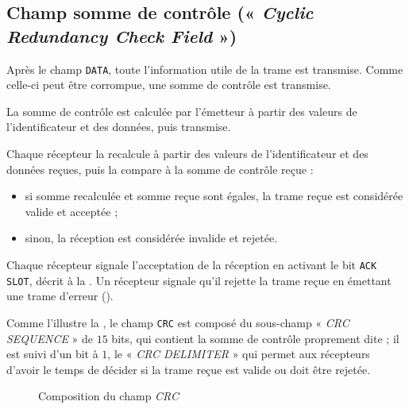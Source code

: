 \subsection{Champ somme de contrôle (« \emph{Cyclic Redundancy Check Field} »)}

Après le champ \texttt{DATA}, toute l'information utile de la trame est transmise. Comme celle-ci peut être corrompue, une somme de contrôle est transmise. 

La somme de contrôle est calculée par l'émetteur à partir des valeurs de l'identificateur et des données, puis transmise.

Chaque récepteur la recalcule à partir des valeurs de l'identificateur et des données reçues, puis la compare à la somme de contrôle reçue :
\begin{itemize}
  \item si somme recalculée et somme reçue sont égales, la trame reçue est considérée valide et acceptée ;
  \item sinon, la réception est considérée invalide et rejetée.
\end{itemize}

Chaque récepteur signale l'acceptation de la réception en activant le bit \texttt{ACK SLOT}, décrit à la . Un récepteur signale qu'il rejette la trame reçue en émettant une trame d'erreur ().

Comme l'illustre la , le champ \texttt{CRC} est composé du sous-champ « \emph{CRC SEQUENCE} » de $15$ bits, qui contient la somme de contrôle proprement dite ; il est suivi d'un bit à $1$, le « \emph{CRC DELIMITER} » qui permet aux récepteurs d'avoir le temps de décider si la trame reçue est valide ou doit être rejetée.

\begin{figure}[h]
  \centering
  \caption{Composition du champ \emph{CRC}}
\end{figure}


